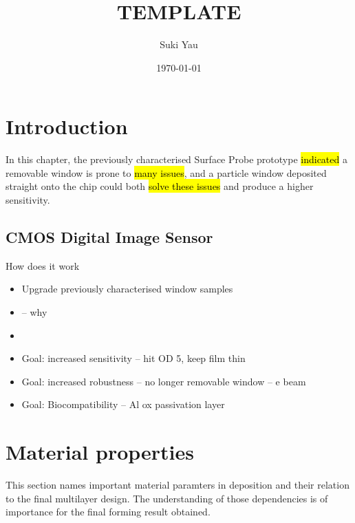\documentclass{article}
\title{TEMPLATE}
\author{Suki Yau}
\date{\today}
\begin{document}
\lstset{language=Matlab}

\maketitle

\newpage
\tableofcontents
\listoffigures


\section{Introduction}
In this chapter, the previously characterised Surface Probe prototype \hl{indicated} a removable window is prone
to \hl{many issues}, and a particle window deposited straight onto the chip could both \hl{solve these issues}
and produce a higher sensitivity.

\subsection*{CMOS Digital Image Sensor}

How does it work

\begin{itemize}
\item Upgrade previously characterised window samples 
\item  -- why 
\item 
\item Goal: increased sensitivity -- hit OD 5, keep film thin 
\item Goal: increased robustness -- no longer removable window -- e beam 
\item Goal: Biocompatibility -- Al ox passivation layer 
\end{itemize}

\section{Material properties}

This section names important material paramters in deposition and their
relation to the final multilayer design. The understanding of those dependencies
is of importance for the final forming result obtained.
\end{document}
